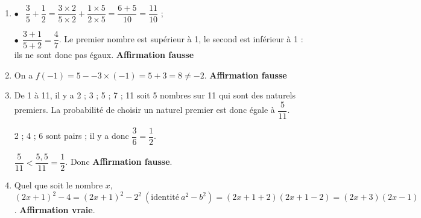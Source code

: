 
\medskip


%

\begin{enumerate}[itemsep=5mm]
	\item %
$\bullet~~$ $\dfrac{3}{5} + \dfrac{1}{2}  = \dfrac{3\times 2}{5\times 2} + \dfrac{1\times 5}{2\times 5} = \dfrac{6 + 5}{10} = \dfrac{11}{10}$ ;

$\bullet~~$$\dfrac{3 + 1}{5 + 2} = \dfrac{4}{7}$.
Le premier nombre est supérieur à 1, le second est inférieur à 1 : ils ne sont donc pas égaux. \hfill \textbf{Affirmation fausse}	
	\item %
		
On a $f(- 1) = 5 - - 3\times (- 1) = 5 + 3 = 8 \ne - 2$. \hfill \textbf{Affirmation fausse}

	\item %
	

De 1 à 11, il y a 2 ; 3 ; 5 ; 7 ; 11 soit 5 nombres sur 11 qui sont des naturels premiers. La probabilité de choisir un naturel premier est donc égale à $\dfrac{5}{11}$.

2 ; 4 ; 6 sont pairs  ; il y a donc $\dfrac{3}{6} = \dfrac{1}{2}$.

$\dfrac{5}{11} < \dfrac{5,5}{11} = \dfrac{1}{2}$. Donc \hfill \textbf{Affirmation fausse}.	
	\item %
	Quel que soit le nombre $x$, \: $(2x + 1)^2 - 4 = (2x + 1)^2 - 2^2\: \left(\text{identité}\: a^2 - b^2\right) = (2x + 1 + 2)(2x + 1- 2) = (2x + 3)(2x - 1)$. \hfill \textbf{Affirmation vraie}.
\end{enumerate}
\bigskip

